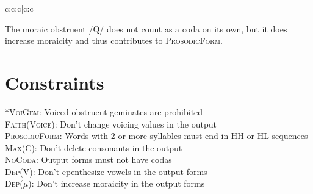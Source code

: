 \documentclass{article}
\begin{document}
\vspace{.25cm}

\begin{exe}
\ex
\label{t2}
\begin{tableau}{c:c:c|c:c}
                                             
               \vio{}            \vio{}                          \vio{*!}                   \vio{}                      \vio{}              
               \vio{}            \vio{}                       \vio{*!}                   \vio{}                         \vio{*}           
   \vio{}            \vio{}                         \vio{}                    \vio{*}                        \vio{**}
             \vio{}            \vio{*!}                         \vio{}                    \vio{*}                        \vio{**} 
               \vio{}            \vio{*!}                          \vio{}                   \vio{*}                       \vio{*}
                   \vio{*!}           \vio{}                          \vio{}                  \vio{}                            \vio{}
\end{tableau}
\end{exe}

The moraic obstruent /Q/ does not count as a coda on its own, but it does increase moraicity and thus contributes to \textsc{ProsodicForm}.

\section*{Constraints}
\textsc{*VoiGem}: Voiced obstruent geminates are prohibited \\
\textsc{Faith(Voice)}: Don't change voicing values in the output \\
\textsc{ProsodicForm}: Words with 2 or more syllables must end in HH or HL sequences \\
\textsc{Max(C)}: Don't delete consonants in the output \\
\textsc{NoCoda}: Output forms must not have codas \\
\textsc{Dep(V)}: Don't epenthesize vowels in the output forms \\
\textsc{Dep($\mu$)}: Don't increase moraicity in the output forms



\end{document}
